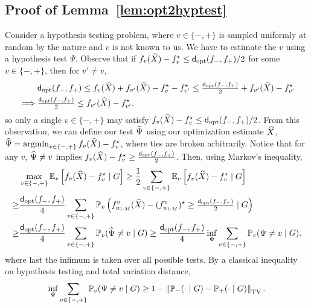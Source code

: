 \subsection{Proof of Lemma~\ref{lem:opt2hyptest}}
\label{sec:proof-opt2hyptest}
Consider a hypothesis testing problem, where $v \in \{-,+\}$ is sampled uniformly at random by the nature
and $v$ is not known to us. We have to estimate the $v$ using a hypothesis test $\Psi$.
Observe that if $f_v(\what X) - f_v\opt \leq \fndist(f_-, f_+) / 2$ for some $v \in \{-,+\}$, then for $v' \neq v$,
\begin{align*}
	&\fndist(f_-, f_+) \leq f_v (\what X) + f_{v'}(\what X) - f_v\opt - f_{v'}\opt
	\leq \tfrac{\fndist(f_-, f_+)}{2} + f_{v'}(\what X) - f_{v'}\opt\\
	\implies & \tfrac{\fndist(f_-, f_+)}{2} \leq f_{v'}(\what X) - f_{v'}\opt.
\end{align*}
so only a single $v \in \{-,+\}$ may satisfy $f_v(\what{X}) - f_v\opt \leq \fndist(f_-, f_+) / 2$.
From this observation, we can define our test $\widehat{\Psi}$ using our optimization estimate $\widehat{X}$,
$\what \Psi = \argmin_{v \in \{-,+\}} f_v (\what{X}) - f_v\opt$, where ties are broken arbitrarily.
Notice that for any $v$, $\widehat{\Psi} \neq v$ implies $f_v (\what{X}) - f_v\opt \geq \tfrac{\fndist(f_-, f_+)}{2}$.
Then, using Markov's inequality,
\begin{align*}
	&\max_{v \in \{-,+\}} \E_v \left [ f_v(\what X) - f_v\opt \mid G \right ]
	\geq \half \sum_{v \in \{-,+\}} \E_v \left [ f_v(\what X) - f_v\opt \mid G \right ]\\
	\geq&\frac{\fndist(f_-, f_+)}{4} \sum_{v \in \{-,+\}} \P_v \left (\ftnuv (\what{X}) - (\ftnuv)^\star \geq \tfrac{\fndist(f_-, f_+)}{2} \mid G \right )\\
	\geq&\frac{\fndist(f_-, f_+)}{4} \sum_{v \in \{-,+\}} \P_v (\what \Psi \neq v \mid G)
	\geq \frac{\fndist(f_-, f_+)}{4} \inf_\Psi \sum_{v \in \{-,+\}} \P_v (\Psi \neq v \mid G).
\end{align*}
where last the infimum is taken over all possible tests.
By a classical inequality on hypothesis testing and total variation distance,
\begin{align*}
	\inf_\Psi  \sum_{v \in \{-,+\}} \P_v (\Psi \neq v \mid G) 
	\geq 1-\tvnorm{ \P_- (\cdot \mid G) -\P_+ (\cdot \mid G) }.
\end{align*}

